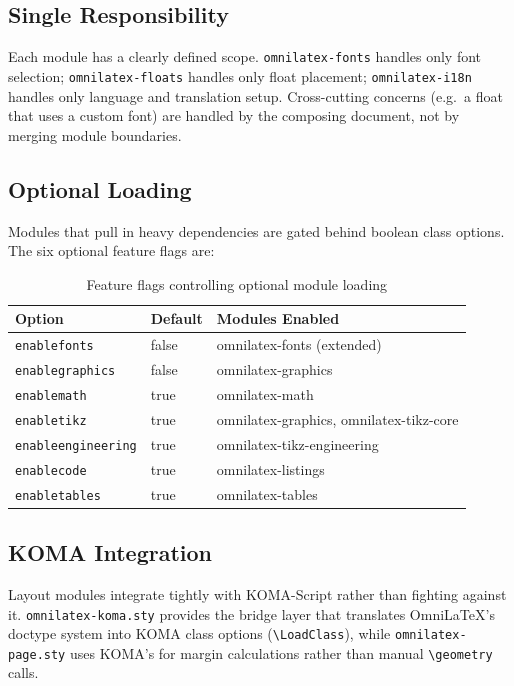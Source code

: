 \subsection{Single Responsibility}

Each module has a clearly defined scope.  \texttt{omnilatex-fonts}
handles only font selection; \texttt{omnilatex-floats} handles only
float placement; \texttt{omnilatex-i18n} handles only language and
translation setup.  Cross-cutting concerns (e.g.\ a float that uses a
custom font) are handled by the composing document, not by merging module
boundaries.

\subsection{Optional Loading}

Modules that pull in heavy dependencies are gated behind boolean class
options.  The six optional feature flags are:

\begin{table}[htbp]
  \centering
  \begin{tabular}{@{} l l l @{}}
    \toprule
    \textbf{Option} & \textbf{Default} & \textbf{Modules Enabled} \\
    \midrule
    \texttt{enablefonts} & false & omnilatex-fonts (extended) \\
    \texttt{enablegraphics} & false & omnilatex-graphics \\
    \texttt{enablemath} & true & omnilatex-math \\
    \texttt{enabletikz} & true & omnilatex-graphics, omnilatex-tikz-core \\
    \texttt{enableengineering} & true & omnilatex-tikz-engineering \\
    \texttt{enablecode} & true & omnilatex-listings \\
    \texttt{enabletables} & true & omnilatex-tables \\
    \bottomrule
  \end{tabular}
  \caption{Feature flags controlling optional module loading}
\end{table}

\subsection{KOMA Integration}

Layout modules integrate tightly with KOMA-Script rather than fighting
against it.  \texttt{omnilatex-koma.sty} provides the bridge layer that
translates OmniLaTeX's doctype system into KOMA class options
(\texttt{\textbackslash LoadClass}), while \texttt{omnilatex-page.sty}
uses KOMA's  for margin calculations rather than
manual \texttt{\textbackslash geometry} calls.

